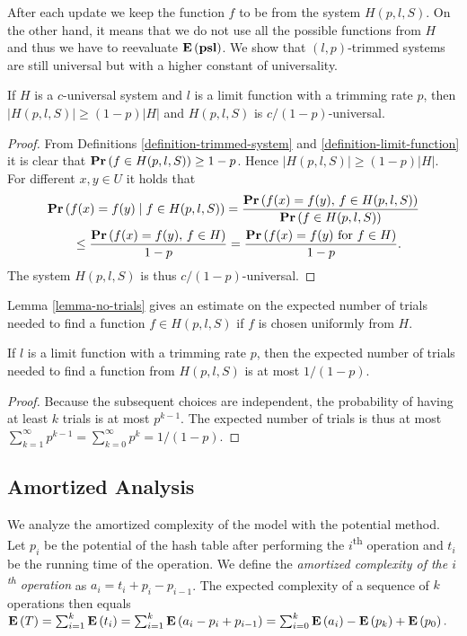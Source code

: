After each update we keep the function $f$ to be from the system $H(p, l, S)$.
On the other hand, it means that we do not use all the possible functions from $H$ and thus we have to reevaluate $\mathbf{E}\left(\mathbf{psl}\right)$.
We show that $(l, p)$-trimmed systems are still universal but with a higher constant of universality.
\begin{lemma}
\label{lemma-trimmed-system}
If $H$ is a $c$-universal system and $l$ is a limit function with a trimming rate $p$, then $|H(p, l, S)| \geq (1 - p)|H|$ and $H(p, l, S)$ is $c/(1 - p)$-universal.
\end{lemma}
\begin{proof}
From Definitions \ref{definition-trimmed-system} and \ref{definition-limit-function} it is clear that $\mathbf{Pr}\left(f \in H(p, l, S)\right) \geq 1 - p$. Hence $|H(p, l, S)| \geq (1 - p)|H|$.
For different $x, y \in U$ it holds that
\[
\begin{split}
& \mathbf{Pr}\left(f(x) = f(y) \mid f \in H(p, l, S)\right) 
	= \frac{\mathbf{Pr}\left(f(x) = f(y),\, f \in H(p, l, S)\right)}{\mathbf{Pr}\left(f \in H(p, l, S)\right)} \\
	& \qquad \leq \frac{\mathbf{Pr}\left(f(x) = f(y),\, f \in H\right)}{1 - p} = \frac{\mathbf{Pr}\left(f(x) = f(y) \mbox{ for } f \in H\right)}{1 - p}. \\
\end{split}
\]
The system $H(p, l, S)$ is thus $c/(1-p)$-universal.
\end{proof}

Lemma \ref{lemma-no-trials} gives an estimate on the expected number of trials needed to find a function $f \in H(p, l, S)$ if $f$ is chosen uniformly from $H$.
\begin{lemma}
\label{lemma-no-trials}
If $l$ is a limit function with a trimming rate $p$, then the expected number of trials needed to find a function from $H(p, l, S)$ is at most ${1}/{(1 - p)}$.
\end{lemma}
\begin{proof}
Because the subsequent choices are independent, the probability of having at least $k$ trials is at most $p^{k - 1}$. 
The expected number of trials is thus at most $\sum_{k = 1}^{\infty} p^{k - 1} = \sum_{k = 0}^{\infty} p^k = {1}/{(1 - p)}.$
\end{proof}

\subsection{Amortized Analysis}
We analyze the amortized complexity of the model with the potential method. 
Let $p_i$ be the potential of the hash table after performing the $i$\textsuperscript{th} operation and $t_i$ be the running time of the operation. 
We define the \emph{amortized complexity of the $i$\textsuperscript{th} operation} as $a_i = t_i + p_i - p_{i - 1}$. 
The expected complexity of a sequence of $k$ operations then equals $\mathbf{E}\left(T\right) = \sum_{i=1}^{k} \mathbf{E}\left(t_i\right) = \sum_{i = 1}^{k} \mathbf{E}\left(a_i - p_i + p_{i - 1}\right) = \sum_{i=0}^{k} \mathbf{E}\left(a_i\right) - \mathbf{E}\left(p_k\right) + \mathbf{E}\left(p_0\right).$

